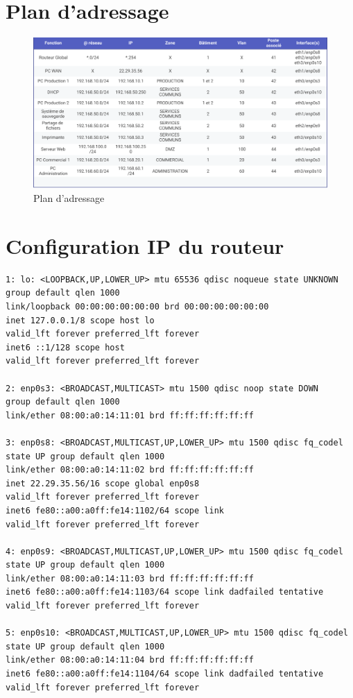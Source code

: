 \documentclass[a4paper,12pt,openany]{report}
\begin{document}
\begin{appendices}
        \chapter{Plan d'adressage}
            \begin{figure}[H]
                \centering
                \includegraphics[width=1.2\textwidth]{Images/Plan_adressage.pdf}
                \caption{Plan d'adressage}
            \end{figure}
        \chapter{Configuration IP du routeur}
            \begin{verbatim}
1: lo: <LOOPBACK,UP,LOWER_UP> mtu 65536 qdisc noqueue state UNKNOWN 
group default qlen 1000
link/loopback 00:00:00:00:00:00 brd 00:00:00:00:00:00
inet 127.0.0.1/8 scope host lo
valid_lft forever preferred_lft forever
inet6 ::1/128 scope host 
valid_lft forever preferred_lft forever

2: enp0s3: <BROADCAST,MULTICAST> mtu 1500 qdisc noop state DOWN 
group default qlen 1000
link/ether 08:00:a0:14:11:01 brd ff:ff:ff:ff:ff:ff

3: enp0s8: <BROADCAST,MULTICAST,UP,LOWER_UP> mtu 1500 qdisc fq_codel 
state UP group default qlen 1000
link/ether 08:00:a0:14:11:02 brd ff:ff:ff:ff:ff:ff
inet 22.29.35.56/16 scope global enp0s8
valid_lft forever preferred_lft forever
inet6 fe80::a00:a0ff:fe14:1102/64 scope link 
valid_lft forever preferred_lft forever

4: enp0s9: <BROADCAST,MULTICAST,UP,LOWER_UP> mtu 1500 qdisc fq_codel 
state UP group default qlen 1000
link/ether 08:00:a0:14:11:03 brd ff:ff:ff:ff:ff:ff
inet6 fe80::a00:a0ff:fe14:1103/64 scope link dadfailed tentative 
valid_lft forever preferred_lft forever

5: enp0s10: <BROADCAST,MULTICAST,UP,LOWER_UP> mtu 1500 qdisc fq_codel 
state UP group default qlen 1000
link/ether 08:00:a0:14:11:04 brd ff:ff:ff:ff:ff:ff
inet6 fe80::a00:a0ff:fe14:1104/64 scope link dadfailed tentative 
valid_lft forever preferred_lft forever


\end{verbatim}
\end{appendices}
\end{document}
